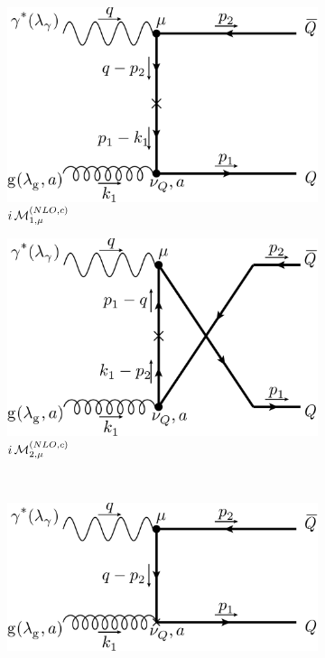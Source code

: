 \begin{figure}[ht!]
	\begin{subfigure}[t]{.4\textwidth}
		\includegraphics[width=\textwidth]{pyfeyn/nlo-c-m}
		\caption{$i\operatorname{\mathcal M}^{(NLO,c)}_{1,\mu}$}
	\end{subfigure}\hspace{.15\textwidth}%
	\begin{subfigure}[t]{.4\textwidth}
		\includegraphics[width=\textwidth]{pyfeyn/nlo-c-mcr}
		\caption{$i\operatorname{\mathcal M}^{(NLO,c)}_{2,\mu}$}
	\end{subfigure}\\
	\begin{subfigure}[t]{.4\textwidth}
		\includegraphics[width=\textwidth]{pyfeyn/nlo-c-nuQ}

\end{subfigure}
\end{figure}
